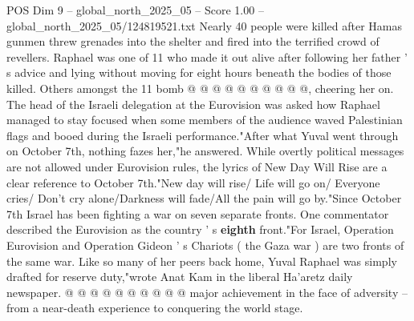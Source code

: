 \begin{textsample}{POS Dim 9 – global\_north\_2025\_05 – Score 1.00 – global\_north\_2025\_05/124819521.txt}
Nearly 40 people were killed after Hamas gunmen threw grenades into the shelter and fired into the terrified crowd of revellers.
Raphael was one of 11 who made it out alive after following her father ' s advice and lying without moving for eight hours beneath the bodies of those killed.
Others amongst the 11 bomb @ @ @ @ @ @ @ @ @ @, cheering her on.
The head of the Israeli delegation at the Eurovision was asked how Raphael managed to stay focused when some members of the audience waved Palestinian flags and booed during the Israeli performance."After what Yuval went through on October 7th, nothing fazes her,"he answered.
While overtly political messages are not allowed under Eurovision rules, the lyrics of New Day Will Rise are a clear reference to October 7th."New day will rise/ Life will go on/ Everyone cries/ Don't cry alone/Darkness will fade/All the pain will go by."Since October 7th Israel has been fighting a war on seven separate fronts.
One commentator described the Eurovision as the country ' s \textbf{eighth} front."For Israel, Operation Eurovision and Operation Gideon ' s Chariots ( the Gaza war ) are two fronts of the same war.
Like so many of her peers back home, Yuval Raphael was simply drafted for reserve duty,"wrote Anat Kam in the liberal Ha'aretz daily newspaper. @ @ @ @ @ @ @ @ @ @ major achievement in the face of adversity -- from a near-death experience to conquering the world stage.

\end{textsample}
